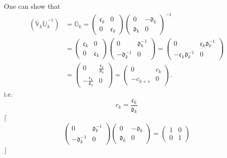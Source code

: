 \documentclass[aps, preprint]{revtex4}
\begin{document}
One can show that
\begin{align}\left (\overline{\mathbb{V}}_{k} \overline{\mathbb{U}}_{k}^{ -1}\right ) &  =\mathbb{G}_{k} =\left (\begin{array}{cc}\mathfrak{c}_{k} & 0 \\
0 & \mathfrak{c}_{k}\end{array}\right ) \left (\begin{array}{cc}0 &  -\mathfrak{d}_{k} \\
\mathfrak{d}_{k} & 0\end{array}\right )^{ -1} \\
 &  =\left (\begin{array}{cc}\mathfrak{c}_{k} & 0 \\
0 & \mathfrak{c}_{k}\end{array}\right ) \left (\begin{array}{cc}0 & \mathfrak{d}_{k}^{ -1} \\
 -\mathfrak{d}_{k}^{ -1} & 0\end{array}\right ) =\left (\begin{array}{cc}0 & \mathfrak{c}_{k} \mathfrak{d}_{k}^{ -1} \\
 -\mathfrak{c}_{k} \mathfrak{d}_{k}^{ -1} & 0\end{array}\right ) \\
 &  =\left (\begin{array}{cc}0 & \frac{\mathfrak{c}_{k}}{\mathfrak{d}_{k}} \\
 -\frac{\mathfrak{c}_{k}}{\mathfrak{d}_{k}} & 0\end{array}\right ) =\left (\begin{array}{cc}0 & c_{k} \\
 -c_{k +s} & 0\end{array}\right )\text{.}\end{align}i.e.
\begin{equation}c_{k} =\frac{\mathfrak{c}_{k}}{\mathfrak{d}_{k}}
\end{equation}$\lceil $
\begin{equation}\left (\begin{array}{cc}0 & \mathfrak{d}_{k}^{ -1} \\
 -\mathfrak{d}_{k}^{ -1} & 0\end{array}\right ) \left (\begin{array}{cc}0 &  -\mathfrak{d}_{k} \\
\mathfrak{d}_{k} & 0\end{array}\right ) =\left (\begin{array}{cc}1 & 0 \\
0 & 1\end{array}\right )
\end{equation}$\rfloor $
\end{document}

